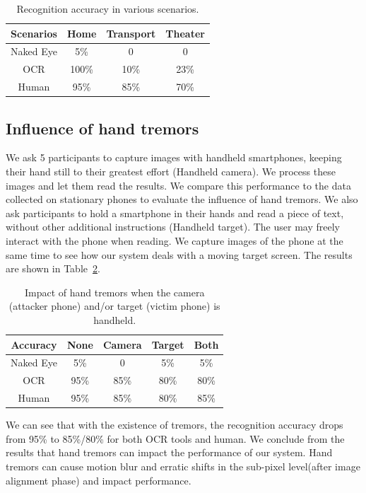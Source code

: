 \begin{table}[!t]
    \centering
    \caption{Recognition accuracy in various scenarios.}
    \begin{tabular}{@{}cccc@{}}
        \toprule
    Scenarios & Home & Transport & Theater \\ \midrule
    Naked Eye & 5\% & 0 & 0\\ 
    \midrule
    OCR & 100\% & 10\% & 23\%\\ 
    Human & 95\% & 85\% & 70\%\\ \bottomrule
    \end{tabular}
    \label{table-scenarios}
\end{table}

\subsection{Influence of hand tremors}
We ask 5 participants to capture images with handheld smartphones, keeping their hand still to their greatest effort (Handheld camera). We process these images and let them read the results. We compare this performance to the data collected on stationary phones to evaluate the influence of hand tremors.
We also ask participants to hold a smartphone in their hands and read a piece of text, without other additional instructions (Handheld target). The user may freely interact with the phone when reading. We capture images of the phone at the same time to see how our system deals with a moving target screen. The results are shown in Table~\ref{table-tremor}.

\begin{table}[!t] 
    \centering
    \caption{Impact of hand tremors when the camera (attacker phone) and/or target (victim phone) is handheld.}
    \begin{tabular}{ccccc}
        \toprule
    Accuracy & None & Camera & Target & Both  \\
    \midrule
    Naked Eye & 5\% & 0 & 5\% & 5\%\\ 
    \midrule
    OCR & 95\% & 85\% & 80\% & 80\%\\ 
    Human & 95\% & 85\% & 80\% & 85\%\\ \bottomrule
    \end{tabular}
    \label{table-tremor}
\end{table}

We can see that with the existence of tremors, the recognition accuracy drops from 95\% to 85\%/80\% for both OCR tools and human. We conclude from the results that hand tremors can impact the performance of our system. Hand tremors can cause motion blur and erratic shifts in the sub-pixel level(after image alignment phase) and impact performance.



